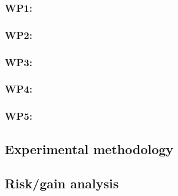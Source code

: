 \subsubsection{WP1: \textbf{\wpOne}}

\subsubsection{WP2: \textbf{\wpTwo}}

\subsubsection{WP3: \textbf{\wpThree}}

\subsubsection{WP4: \textbf{\wpFour}}

\subsubsection{WP5: \textbf{\wpFive}}


\subsection{Experimental methodology}


\subsection{Risk/gain analysis}


\newpage
\printbibliography

